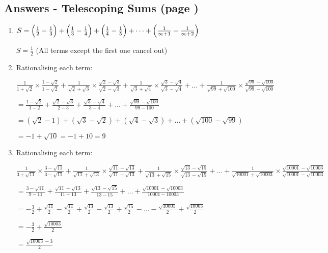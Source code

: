 \documentclass[../main.tex]{subfiles}
\begin{document}
\subsection*{Answers - Telescoping Sums (page \pageref{telescoping sums})}
\label{Telescoping sums answers}
\begin{enumerate}[itemsep=0.7cm]
    \item 
    $S=\Bigl(\frac{1}{2}-\frac{1}{3}\Bigr)+\Bigl(\frac{1}{3}-\frac{1}{4}\Bigr)+\Bigl(\frac{1}{4}-\frac{1}{5}\Bigr)+\dots +\Bigl(\frac{1}{\infty +1}-\frac{1}{\infty +2}\Bigr)$

    $S=\frac{1}{2}$ (All terms except the first one cancel out)

    \item 
    Rationalising each term:

    $\frac{1}{1+\sqrt{2}}\times \frac{1-\sqrt{2}}{1-\sqrt{2}}+\frac{1}{\sqrt{2}+\sqrt{3}}\times \frac{\sqrt{2}-\sqrt{3}}{\sqrt{2}-\sqrt{3}}+\frac{1}{\sqrt{3}+\sqrt{4}}\times \frac{\sqrt{3}-\sqrt{4}}{\sqrt{3}-\sqrt{4}}+\dots +\frac{1}{\sqrt{99}+\sqrt{100}}\times \frac{\sqrt{99}-\sqrt{100}}{\sqrt{99}-\sqrt{100}}$

    $=\frac{1-\sqrt{2}}{1-2}+\frac{\sqrt{2}-\sqrt{3}}{2-3}+\frac{\sqrt{3}-\sqrt{4}}{3-4}+\dots +\frac{\sqrt{99}-\sqrt{100}}{99-100}$

    $=(\sqrt{2}-1)+(\sqrt{3}-\sqrt{2})+(\sqrt{4}-\sqrt{3})+\dots +(\sqrt{100}-\sqrt{99})$

    $=-1 + \sqrt{10}=-1+10=9$

    \item 
    Rationalising each term:

    $\frac{1}{3+\sqrt{11}}\times \frac{3-\sqrt{11}}{3-\sqrt{11}}+\frac{1}{\sqrt{11}+\sqrt{13}}\times \frac{\sqrt{11}-\sqrt{13}}{\sqrt{11}-\sqrt{13}}+\frac{1}{\sqrt{13}+\sqrt{15}}\times \frac{\sqrt{13}-\sqrt{15}}{\sqrt{13}-\sqrt{15}}+\dots +\frac{1}{\sqrt{10001}+\sqrt{10003}}\times \frac{\sqrt{10001}-\sqrt{10003}}{\sqrt{10001}-\sqrt{10003}}$

    $=\frac{3-\sqrt{11}}{9-11}+\frac{\sqrt{11}-\sqrt{13}}{11-13}+\frac{\sqrt{13}-\sqrt{15}}{13-15}+\dots +\frac{\sqrt{10001}-\sqrt{10003}}{10001-10003}$

    $=-\frac{3}{2}+\frac{\sqrt{11}}{2}-\frac{\sqrt{11}}{2}+\frac{\sqrt{13}}{2}-\frac{\sqrt{13}}{2}+\frac{\sqrt{15}}{2}-\dots -\frac{\sqrt{10001}}{2}+\frac{\sqrt{10003}}{2}$

    $=-\frac{3}{2}+\frac{\sqrt{10003}}{2}$

    $=\frac{\sqrt{10003}-3}{2}$


\end{enumerate}
\end{document}
